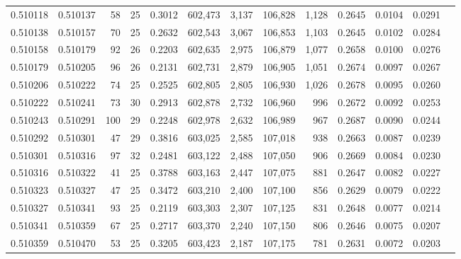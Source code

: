 \begin{tabular}{rrrrrrrrrrrrr}
0.510118 & 0.510137 &  58 &  25 &                                     0.3012 & 602,473 &   3,137 & 106,828 &   1,128 & 0.2645 & 0.0104 & 0.0291 \\
0.510138 & 0.510157 &  70 &  25 &                                     0.2632 & 602,543 &   3,067 & 106,853 &   1,103 & 0.2645 & 0.0102 & 0.0284 \\
0.510158 & 0.510179 &  92 &  26 &                                     0.2203 & 602,635 &   2,975 & 106,879 &   1,077 & 0.2658 & 0.0100 & 0.0276 \\
0.510179 & 0.510205 &  96 &  26 &                                     0.2131 & 602,731 &   2,879 & 106,905 &   1,051 & 0.2674 & 0.0097 & 0.0267 \\
0.510206 & 0.510222 &  74 &  25 &                                     0.2525 & 602,805 &   2,805 & 106,930 &   1,026 & 0.2678 & 0.0095 & 0.0260 \\
0.510222 & 0.510241 &  73 &  30 &                                     0.2913 & 602,878 &   2,732 & 106,960 &     996 & 0.2672 & 0.0092 & 0.0253 \\
0.510243 & 0.510291 & 100 &  29 &                                     0.2248 & 602,978 &   2,632 & 106,989 &     967 & 0.2687 & 0.0090 & 0.0244 \\
0.510292 & 0.510301 &  47 &  29 &                                     0.3816 & 603,025 &   2,585 & 107,018 &     938 & 0.2663 & 0.0087 & 0.0239 \\
0.510301 & 0.510316 &  97 &  32 &                                     0.2481 & 603,122 &   2,488 & 107,050 &     906 & 0.2669 & 0.0084 & 0.0230 \\
0.510316 & 0.510322 &  41 &  25 &                                     0.3788 & 603,163 &   2,447 & 107,075 &     881 & 0.2647 & 0.0082 & 0.0227 \\
0.510323 & 0.510327 &  47 &  25 &                                     0.3472 & 603,210 &   2,400 & 107,100 &     856 & 0.2629 & 0.0079 & 0.0222 \\
0.510327 & 0.510341 &  93 &  25 &                                     0.2119 & 603,303 &   2,307 & 107,125 &     831 & 0.2648 & 0.0077 & 0.0214 \\
0.510341 & 0.510359 &  67 &  25 &                                     0.2717 & 603,370 &   2,240 & 107,150 &     806 & 0.2646 & 0.0075 & 0.0207 \\
0.510359 & 0.510470 &  53 &  25 &                                     0.3205 & 603,423 &   2,187 & 107,175 &     781 & 0.2631 & 0.0072 & 0.0203 \\

\end{tabular}
